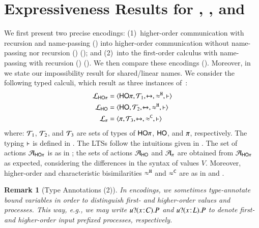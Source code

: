 \documentclass[preprint,11pt]{elsarticle}
\newtheorem{remark}{Remark}[section]
\begin{document}
{{\section{Expressiveness Results for \HOp, \HO, and \sessp}
\label{sec:positive}
%
 We first present two %
 precise encodings: 
(1)~higher-order communication with recursion and name-passing   (\HOp) into 
higher-order communication without name-passing nor recursion (\HO) (); and 
(2)~\HOp into the first-order calculus with name-passing  
with recursion (\sessp) ().
We then compare these  encodings (). 
Moreover, in  we state our impossibility result for shared/linear names.
We consider the following typed calculi, which result as three instances of~:
\begin{align*}
	\mathcal{L}_{\mathsf{HO}\pi} & =\langle \mathsf{HO}\pi, {\cal{T}}_1, \xmapsto{~}, \approx^\mathtt{H}, \vdash \rangle
	\\
	\mathcal{L}_{\mathsf{HO}} & =\langle \mathsf{HO}, {\cal{T}}_2, \xmapsto{~}, \approx^\mathtt{H}, \vdash \rangle
	\\
	\mathcal{L}_{\pi} & =\langle \pi, {\cal{T}}_3, \xmapsto{~}, \approx^\mathtt{C}, \vdash \rangle
\end{align*}
where: 
${\cal{T}}_1$, ${\cal{T}}_2$, 
and ${\cal{T}}_3$
are sets of types of $\mathsf{HO}\pi$, $\mathsf{HO}$, and $\pi$, respectively. 
The typing $\vdash$ is defined in 
.
The LTSs follow the intuitions given in .
The set of actions $\mathcal{A}_{\mathsf{HO}\pi}$ is as in ; the sets of actions $\mathcal{A}_\mathsf{HO}$ and $\mathcal{A}_\pi$ 
are obtained from $\mathcal{A}_{\mathsf{HO}\pi}$ 
as expected, considering the differences in the syntax of values $V$.
Moreover, higher-order and characteristic bisimilarities
$\approx^\mathtt{H}$ 
and 
$\approx^\mathtt{C}$ are 
as in  and .

\begin{remark}[Type Annotations (2)]\label{r:types}
In  encodings, we sometimes type-annotate
bound variables in order to distinguish first- and higher-order values and processes.
This way, e.g., 
we may write $u ? (x \! : \! C) . P$
and 
$u ? (x \! : \! L) . P$ to denote first- and higher-order input prefixed processes, respectively.
\end{remark}

}}
\end{document}
